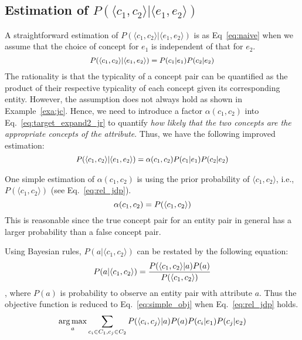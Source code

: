 \subsection{Estimation of $P(\langle c_1,c_2\rangle | \langle e_1,e_2\rangle)$ }
A straightforward estimation of $P( \langle c_{1},c_{2} \rangle | \langle e_{1},e_{2} \rangle )$ is as Eq~\ref{eq:naive} when we assume that the choice of concept for $e_1$ is independent of that for $e_2$.
\begin{equation}
\label{eq:naive}
\small
\begin{split}
P(\langle c_{1},c_{2}\rangle |\langle e_{1},e_{2} \rangle) = P(c_1|e_1) P(c_2|e_2)
\end{split}
\end{equation} The rationality is that the typicality of a concept pair can be quantified as the product of their respective typicality of each concept given its corresponding entity.
However, the assumption does not always hold as shown in Example~\ref{exa:jc}. Hence, we need to introduce a factor $\alpha(c_1,c_2)$ into Eq.~\ref{eq:target_expand2_jr} to quantify {\it how likely that the two concepts are the appropriate concepts of the attribute}. Thus, we have the following improved estimation:
\begin{equation}
\label{eq:target_expand2_jr}
\small
\begin{split}
P(\langle c_{1},c_{2}\rangle |\langle e_{1},e_{2} \rangle) = \alpha(c_1,c_2)  P(c_1|e_1)  P(c_2|e_2)
\end{split}
\end{equation}


One simple estimation of $\alpha(c_1,c_2)$ is using the prior probability of $\langle c_1, c_2\rangle$, i.e., $P(\langle c_1,c_2\rangle)$ (see Eq.~\ref{eq:rel_jdp}).
\begin{equation}\label{eq:rel_jdp}
\small
  \alpha(c_1,c_2) = P(\langle c_1, c_2\rangle)
\end{equation}
This is reasonable since the true concept pair for an entity pair in general has a larger probability than
a false concept pair.

Using Bayesian rules, $P(a| \langle c_{1},c_{2} \rangle )$ can be restated by the following equation:
\begin{equation}
\label{eq:target_expand1}
\small
P(a|\langle c_{1},c_{2} \rangle)= \frac{ P(\langle c_{1},c_{2}\rangle|a)P(a) }{ P(\langle c_{1},c_{2}\rangle) }
\end{equation},
where $P(a)$ is probability to observe an entity pair with attribute $a$.
Thus the objective function is reduced to Eq.~\ref{eq:simple_obj} when Eq.~\ref{eq:rel_jdp} holds.
\begin{equation}
\label{eq:simple_obj}
\small
 \argmax_a \sum_{c_i\in C_1, c_j\in C_2} P(\langle c_{i},c_{j}\rangle |a) P(a) P(c_i|e_1) P(c_j|e_2)
\end{equation}




